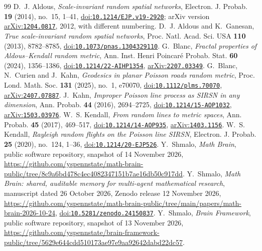 \documentclass[11pt]{amsart}
\theoremstyle{remark}
\newcommand{\doi}[1]{\href{https://doi.org/#1}{doi:\nolinkurl{#1}}}
\newcommand{\arxiv}[1]{\href{https://arxiv.org/abs/#1}{arXiv:\nolinkurl{#1}}}
\begin{document}
\begin{thebibliography}{99}
 D.~J. Aldous, \emph{Scale-invariant random spatial networks}, Electron. J. Probab. \textbf{19} (2014),
no.~15, 1--41, \doi{10.1214/EJP.v19-2920}; arXiv version \arxiv{1204.0817}, 2012, with different numbering.
 D.~J. Aldous and K.~Ganesan, \emph{True scale-invariant random spatial networks}, Proc. Natl. Acad. Sci.
USA \textbf{110} (2013), 8782--8785, \doi{10.1073/pnas.1304329110}.
 G.~Blanc, \emph{Fractal properties of Aldous--Kendall random metric}, Ann. Inst. Henri Poincar\'e
Probab. Stat. \textbf{60} (2024), 1356--1386, \doi{10.1214/22-AIHP1354}, \arxiv{2207.03349}.
 G.~Blanc, N.~Curien and J.~Kahn, \emph{Geodesics in planar Poisson roads random metric}, Proc. Lond.
Math. Soc. \textbf{131} (2025), no.~1, e70070, \doi{10.1112/plms.70070}, \arxiv{2407.07887}.
 J.~Kahn, \emph{Improper Poisson line process as SIRSN in any dimension}, Ann. Probab. \textbf{44}
(2016), 2694--2725, \doi{10.1214/15-AOP1032}, \arxiv{1503.03976}.
 W.~S. Kendall, \emph{From random lines to metric spaces}, Ann. Probab. \textbf{45} (2017), 469--517,
\doi{10.1214/14-AOP935}, \arxiv{1403.1156}.
 W.~S. Kendall, \emph{Rayleigh random flights on the Poisson line SIRSN}, Electron. J. Probab.
\textbf{25} (2020), no.~124, 1--36, \doi{10.1214/20-EJP526}.
 Y.~Shmalo, \emph{Math Brain}, public software repository, snapshot of 14 November 2026,
\url{https://github.com/yspennstate/math-brain-public/tree/8c9a6bd478c4ec4082347151b7ae16db50c917dd}.
 Y.~Shmalo, \emph{Math Brain: shared, auditable memory for multi-agent mathematical research},
manuscript dated 26 October 2026, Zenodo release 12 November 2026,
\url{https://github.com/yspennstate/math-brain-public/tree/main/papers/math-brain-2026-10-24},
\doi{10.5281/zenodo.24150837}.
 Y.~Shmalo, \emph{Brain Framework}, public software repository, snapshot of 13 November 2026,
\url{https://github.com/yspennstate/brain-framework-public/tree/5629e644cdd510173ae97e9aa92642dabd22dc57}.
\end{thebibliography}
\end{document}
